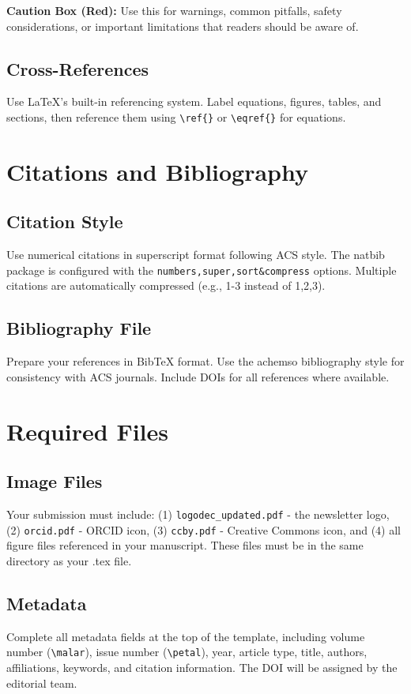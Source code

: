 \documentclass[10pt, a4paper]{article}
\begin{document}
	\begin{cautionbox}
		\textbf{Caution Box (Red):} Use this for warnings, common pitfalls, safety considerations, or important limitations that readers should be aware of.
	\end{cautionbox}
	
	\subsection{Cross-References} Use LaTeX's built-in referencing system. Label equations, figures, tables, and sections, then reference them using \texttt{\textbackslash ref\{\}} or \texttt{\textbackslash eqref\{\}} for equations.
	
	\section{Citations and Bibliography}
	
	\subsection{Citation Style} Use numerical citations in superscript format following ACS style. The natbib package is configured with the \texttt{numbers,super,sort\&compress} options. Multiple citations are automatically compressed (e.g., 1-3 instead of 1,2,3).
	
	\subsection{Bibliography File} Prepare your references in BibTeX format. Use the achemso bibliography style for consistency with ACS journals. Include DOIs for all references where available.
	
	\section{Required Files}
	
	\subsection{Image Files} Your submission must include: (1) \texttt{logodec\_updated.pdf} - the newsletter logo, (2) \texttt{orcid.pdf} - ORCID icon, (3) \texttt{ccby.pdf} - Creative Commons icon, and (4) all figure files referenced in your manuscript. These files must be in the same directory as your .tex file.
	
	\subsection{Metadata} Complete all metadata fields at the top of the template, including volume number (\texttt{\textbackslash malar}), issue number (\texttt{\textbackslash petal}), year, article type, title, authors, affiliations, keywords, and citation information. The DOI will be assigned by the editorial team.
	
\end{document}
